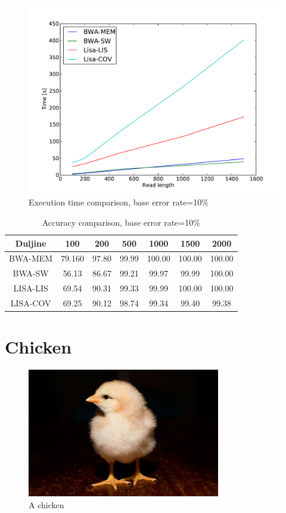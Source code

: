 \documentclass[times, utf8, diplomski]{fer}
\begin{document}
\begin{figure}[H]
\centering
\includegraphics[width=1.0\textwidth]{../img/banana-e10-time.pdf}
\caption{Execution time comparison, base error rate=10\%}\label{banana-e10-time}
\end{figure}

\begin{table}[H]
\centering
\begin{tabular}{|c||c|c|c|c|c|c|}
\hline
	Duljine & 100 & 200 & 500 & 1000 & 1500 & 2000\\
\hline
\hline
	BWA-MEM & 79.160 & 97.80 & 99.99 & 100.00 & 100.00 & 100.00\\
\hline
	BWA-SW  & 56.13 & 86.67 & 99.21 & 99.97 & 99.99 & 100.00\\
\hline
	LISA-LIS   & 69.54 & 90.31 & 99.33 & 99.99 & 100.00 & 100.00\\
\hline
	LISA-COV  & 69.25 & 90.12 & 98.74 & 99.34 & 99.40 & 99.38\\
\hline
\end{tabular}
\caption{Accuracy comparison, base error rate=10\%}\label{banana-e10-correct}
\end{table}


\section{Chicken}

\begin{figure}[H]
\centering
\includegraphics[width=0.75\textwidth]{../img/Day_old_chick_black_background.jpg}
\caption{A chicken\cite{chicken.img}}\label{banana}
\end{figure}
\end{document}
